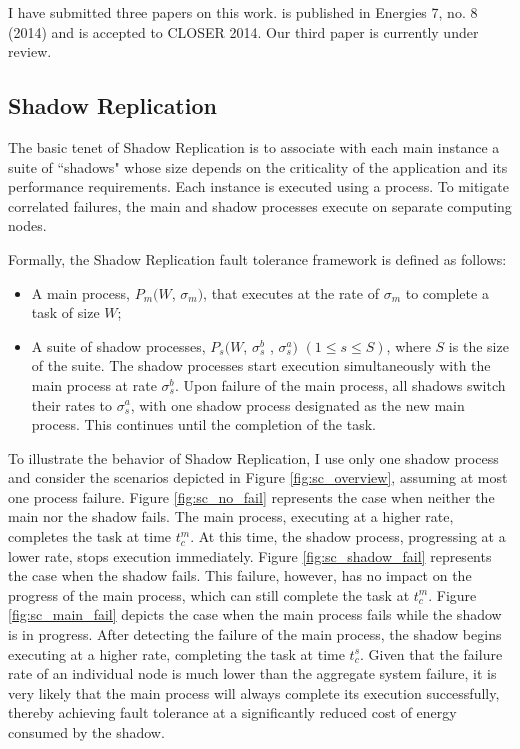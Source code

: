 I have submitted three papers on this work. \cite{cui_en7085151} is published in Energies 7, no. 8 (2014) and \cite{cui_closer_2014} is accepted to CLOSER 2014. Our third paper is currently under review.

\subsection{Shadow Replication}
The basic tenet of Shadow Replication is to associate with each main instance a suite of ``shadows" whose size depends on the criticality of the application and its performance requirements. Each instance is executed using a process. 
To mitigate correlated failures, the main and shadow processes
execute on separate computing nodes.

Formally, the Shadow Replication fault tolerance framework is defined as follows:
\begin{itemize}
	\item A main process, $P_m(W$, $\sigma_m)$, that executes at the rate of $\sigma_m$ to complete a task of size $W$;
	\item A suite of shadow processes, $P_s(W$, $\sigma_s^b$ , $\sigma_s^a)$ $(1 \le s \le S)$, where $S$ is the size of the suite. The shadow processes %
	start execution simultaneously with the main process at rate $\sigma_s^b$. Upon failure of the main process, all shadows switch their rates to $\sigma_s^a$, with one shadow process designated as the new main process. This continues until the completion of the task.
\end{itemize}


To illustrate the behavior of Shadow Replication, I use only one shadow process and consider the scenarios depicted in Figure \ref{fig:sc_overview}, assuming at most one process failure. Figure \ref{fig:sc_no_fail} represents the case when neither the main nor the shadow fails. The main process, executing
at a higher rate, completes the task at time $t_c^m$. At this time, the shadow process, progressing at a lower rate, stops execution immediately. Figure \ref{fig:sc_shadow_fail} represents the case when the shadow fails. This failure, however, has no impact on the progress of the main process, which can still complete the task at $t_c^m$. Figure \ref{fig:sc_main_fail} depicts the case when the main process fails while the shadow is in progress. After detecting the failure of the main process, the shadow begins executing at a higher rate, completing the task at time $t_c^s$. Given that the failure rate of an individual node is much lower than
the aggregate system failure, it is very likely that the main process
will always complete its execution successfully, thereby achieving fault tolerance at a significantly reduced cost of energy consumed by the shadow. 

